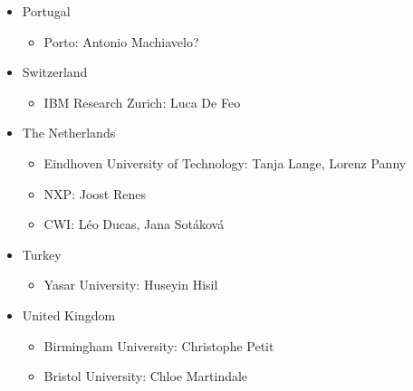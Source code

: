 \documentclass{article}
\begin{document}
\begin{itemize}
	\item Portugal
		\begin{itemize}
			\item {\red Porto: Antonio Machiavelo?}
		\end{itemize}
	\item Switzerland
		\begin{itemize}
			\item IBM Research Zurich: Luca De Feo
		\end{itemize}
	\item The Netherlands
		\begin{itemize}
			\item Eindhoven University of Technology: Tanja Lange, Lorenz Panny
			\item {\red NXP: Joost Renes}
			\item {\red CWI: L\'{e}o Ducas, Jana Sot\'{a}kov\'{a}}
		\end{itemize}
	\item Turkey
		\begin{itemize}
			\item Yasar University: Huseyin Hisil
		\end{itemize}
	\item United Kingdom
		\begin{itemize}
			\item Birmingham University: Christophe Petit
			\item Bristol University: Chloe Martindale
		\end{itemize}
\end{itemize}



\end{document}
